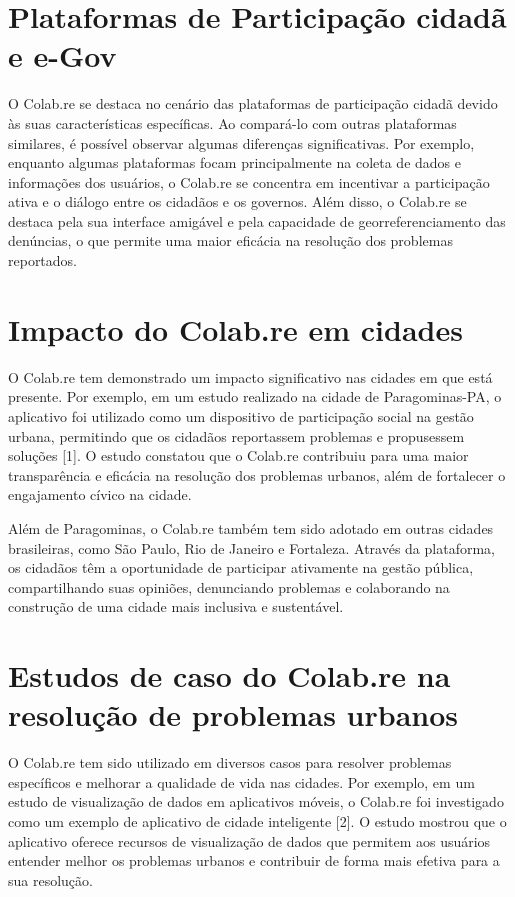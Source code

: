 \section*{Plataformas de Participação cidadã e e-Gov}
O Colab.re se destaca no cenário das plataformas de participação cidadã devido às suas características específicas. Ao compará-lo com outras plataformas similares, é possível observar algumas diferenças significativas. Por exemplo, enquanto algumas plataformas focam principalmente na coleta de dados e informações dos usuários, o Colab.re se concentra em incentivar a participação ativa e o diálogo entre os cidadãos e os governos. Além disso, o Colab.re se destaca pela sua interface amigável e pela capacidade de georreferenciamento das denúncias, o que permite uma maior eficácia na resolução dos problemas reportados.

\section*{Impacto do Colab.re em cidades}
O Colab.re tem demonstrado um impacto significativo nas cidades em que está presente. Por exemplo, em um estudo realizado na cidade de Paragominas-PA, o aplicativo foi utilizado como um dispositivo de participação social na gestão urbana, permitindo que os cidadãos reportassem problemas e propusessem soluções [1]. O estudo constatou que o Colab.re contribuiu para uma maior transparência e eficácia na resolução dos problemas urbanos, além de fortalecer o engajamento cívico na cidade.

Além de Paragominas, o Colab.re também tem sido adotado em outras cidades brasileiras, como São Paulo, Rio de Janeiro e Fortaleza. Através da plataforma, os cidadãos têm a oportunidade de participar ativamente na gestão pública, compartilhando suas opiniões, denunciando problemas e colaborando na construção de uma cidade mais inclusiva e sustentável.

\section*{Estudos de caso do Colab.re na resolução de problemas urbanos}
O Colab.re tem sido utilizado em diversos casos para resolver problemas específicos e melhorar a qualidade de vida nas cidades. Por exemplo, em um estudo de visualização de dados em aplicativos móveis, o Colab.re foi investigado como um exemplo de aplicativo de cidade inteligente [2]. O estudo mostrou que o aplicativo oferece recursos de visualização de dados que permitem aos usuários entender melhor os problemas urbanos e contribuir de forma mais efetiva para a sua resolução.

